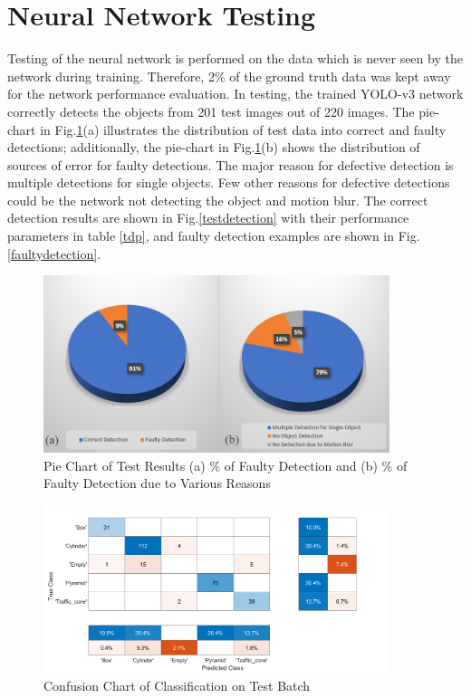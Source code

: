 \section{Neural Network Testing}
Testing of the neural network is performed on the data which is never seen by the network during training. Therefore, 2\% of the ground truth data was kept away for the network performance evaluation. In testing, the trained YOLO-v3 network correctly detects the objects from 201 test images out of 220 images. The pie-chart in Fig.\ref{piechart}(a) illustrates the distribution of test data into correct and faulty detections; additionally, the pie-chart in Fig.\ref{piechart}(b) shows the distribution of sources of error for faulty detections. The major reason for defective detection is multiple detections for single objects. Few other reasons for defective detections could be the network not detecting the object and motion blur. The correct detection results are shown in Fig.\ref{testdetection} with their performance parameters in table \ref{tdp}, and faulty detection examples are shown in Fig.\ref{faultydetection}.   

\begin{figure}
    \centering
    \includegraphics[width=0.9\textwidth]{Images/piechart.png}
    \caption{Pie Chart of Test Results (a) \% of Faulty Detection and (b) \% of Faulty Detection due to Various Reasons}
    \label{piechart}
\end{figure}

\begin{figure}
    \centering
    \includegraphics[width=0.9\textwidth]{Images/confusionchart.png}
    \caption{Confusion Chart of Classification on Test Batch}
    \label{confusionchart}
\end{figure}


